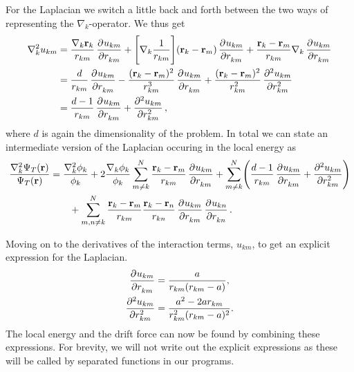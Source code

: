 \documentclass[
    a4paper, aps, twocolumn, floatfix, superscriptaddress, nofootinbib]{revtex4-1}
\newcommand{\vf}{\mathbf}
\newcommand{\1}{\mathds{1}}
\begin{document}
    \begin{widetext}
        For the Laplacian we switch a little back and forth between the
        two ways of representing the $\nabla_k$-operator. We thus get
        \begin{align}
            \nabla_k^2 u_{km}
            &=
            \frac{\nabla_k \vf{r}_k}{r_{km}}\dpd[]{u_{km}}{r_{km}}
            + \Biggl[
                \nabla_k \frac{1}{r_{km}}
            \Biggr]
            (\vf{r}_k - \vf{r}_m)\dpd[]{u_{km}}{r_{km}}
            + \frac{\vf{r}_k - \vf{r}_m}{r_{km}}
            \nabla_k \dpd[]{u_{km}}{r_{km}} \\
            &= \frac{d}{r_{km}}\dpd[]{u_{km}}{r_{km}}
            - \frac{(\vf{r}_k - \vf{r}_m)^2}{r_{km}^3}
            \dpd[]{u_{km}}{r_{km}}
            + \frac{(\vf{r}_k - \vf{r}_m)^2}{r_{km}^2}
            \dpd[2]{u_{km}}{r_{km}} \\
            &=
            \frac{d - 1}{r_{km}}\dpd[]{u_{km}}{r_{km}}
            + \dpd[2]{u_{km}}{r_{km}},
        \end{align}
        where $d$ is again the dimensionality of the problem. In total
        we can state an intermediate version of the Laplacian occuring
        in the local energy as
        \begin{align}
            \frac{\nabla_k^2\Psi_T(\vf{r})}{\Psi_T(\vf{r})}
            &=
            \frac{\nabla_k^2\phi_k}{\phi_k}
            + 2\frac{\nabla_k\phi_k}{\phi_k}
            \sum_{m \neq k}^N
            \frac{\vf{r}_k - \vf{r}_m}{r_{km}}
            \dpd[]{u_{km}}{r_{km}}
            + \sum_{m\neq k}^N
            \Biggl(
                \frac{d - 1}{r_{km}}\dpd[]{u_{km}}{r_{km}}
                + \dpd[2]{u_{km}}{r_{km}}
            \Biggr)
            \nonumber \\
            &\qquad
            +
            \sum_{m, n \neq k}^N
            \frac{\vf{r}_k - \vf{r}_m}{r_{km}}
            \frac{\vf{r}_k - \vf{r}_n}{r_{kn}}
            \dpd[]{u_{km}}{r_{km}}
            \dpd[]{u_{kn}}{r_{kn}}.
        \end{align}
    \end{widetext}
    Moving on to the derivatives of the interaction terms, $u_{km}$, to
    get an explicit expression for the Laplacian.
    \begin{align}
        \dpd[]{u_{km}}{r_{km}}
        &=
        \frac{a}{r_{km}(r_{km} - a)},
        \\
        \dpd[2]{u_{km}}{r_{km}}
        &= \frac{a^2 - 2ar_{km}}{r_{km}^2(r_{km} - a)^2}.
    \end{align}
    The local energy and the drift force can now be found by combining these
    expressions. For brevity, we will not write out the explicit expressions as
    these will be called by separated functions in our programs.
\end{document}
